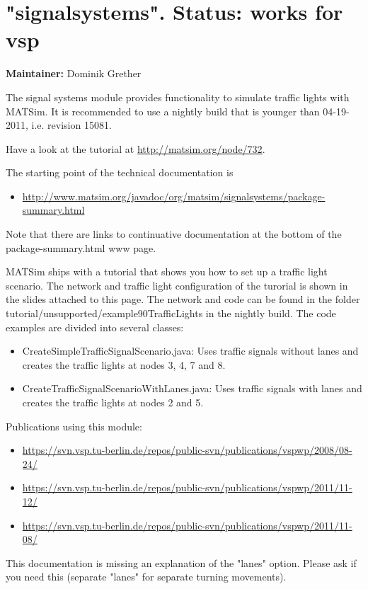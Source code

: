 \documentclass[a4paper,11pt]{report}
\begin{document}
\vfill\eject
\section{"signalsystems". Status: works for vsp}

\textbf{Maintainer:} Dominik Grether

The signal systems module provides functionality to simulate traffic  lights with MATSim. It is recommended to use a nightly build that is  younger than 04-19-2011, i.e. revision 15081.

Have a look at the tutorial at \href{http://matsim.org/node/732}{http://matsim.org/node/732}.

The starting point of the technical documentation is
\begin{itemize}
	\item \href{http://www.matsim.org/javadoc/org/matsim/signalsystems/package-summary.html}{http://www.matsim.org/javadoc/org/matsim/signalsystems/package-summary.html}
\end{itemize}

Note that there are links to continuative documentation at the bottom of the package-summary.html www page.

MATSim ships with a tutorial that shows you how to set up a traffic  light scenario. The network and traffic light configuration of the  turorial is shown in the slides attached to this page. The network and  code can be found in the folder  tutorial/unsupported/example90TrafficLights in the nightly build. The  code examples are divided into several classes:
\begin{itemize}
	\item CreateSimpleTrafficSignalScenario.java: Uses traffic signals  without lanes and creates the traffic lights at nodes 3, 4, 7 and 8.
	\item CreateTrafficSignalScenarioWithLanes.java: Uses traffic signals with lanes and creates the traffic lights at nodes 2 and 5.
\end{itemize}



Publications using this module:
\begin{itemize}
	\item \href{https://svn.vsp.tu-berlin.de/repos/public-svn/publications/vspwp/2008/08-24/}{https://svn.vsp.tu-berlin.de/repos/public-svn/publications/vspwp/2008/08-24/}
	\item \href{https://svn.vsp.tu-berlin.de/repos/public-svn/publications/vspwp/2011/11-12/}{https://svn.vsp.tu-berlin.de/repos/public-svn/publications/vspwp/2011/11-12/}
	\item \href{https://svn.vsp.tu-berlin.de/repos/public-svn/publications/vspwp/2011/11-08/}{https://svn.vsp.tu-berlin.de/repos/public-svn/publications/vspwp/2011/11-08/}
\end{itemize}This documentation is missing an  explanation of the "lanes" option. Please ask if you need this  (separate "lanes" for separate turning movements).
\end{document}
